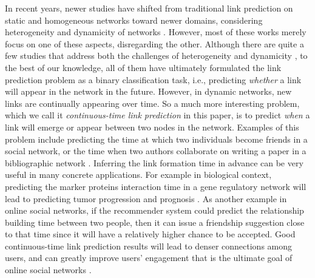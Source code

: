 In recent years, newer studies have shifted from traditional link prediction on static and homogeneous networks toward newer domains, considering heterogeneity and dynamicity of networks \cite{dong2012link, davis2011multi, 7752228, hajibagheri2016leveraging, moradabadi2017novel}. However, most of these works merely focus on one of these aspects, disregarding the other. Although there are quite a few studies that address both the challenges of heterogeneity and dynamicity \cite{aggarwal2012dynamic, sett2017temporal}, to the best of our knowledge, all of them have ultimately formulated the link prediction problem as a binary classification task, i.e., predicting \emph{whether} a link will appear in the network in the future. However, in dynamic networks, new links are continually appearing over time. So a much more interesting problem, which we call it \emph{continuous-time link prediction} in this paper, is to predict \emph{when} a link will emerge or appear between two nodes in the network. Examples of this problem include predicting the time at which two individuals become friends in a social network, or the time when two authors collaborate on writing a paper in a bibliographic network \cite{sun2012will}. Inferring the link formation time in advance can be very useful in many concrete applications. For example in biological context, predicting the marker proteins interaction time in a gene regulatory network will lead to predicting tumor progression and prognosis \cite{taylor2009dynamic}. As another example in online social networks, if the recommender system could predict the relationship building time between two people, then it can issue a friendship suggestion close to that time since it will have a relatively higher chance to be accepted. Good continuous-time link prediction results will lead to denser connections among users, and can greatly improve users' engagement that is the ultimate goal of online social networks \cite{kwak2010twitter}.

